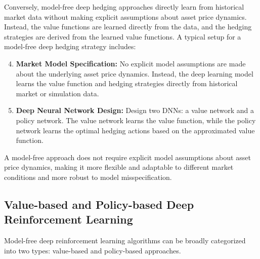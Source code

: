 Conversely, model-free deep hedging approaches directly learn from historical market data without making explicit assumptions about asset price dynamics. 
Instead, the value functions are learned directly from the data, and the hedging strategies are derived from the learned value functions.
A typical setup for a model-free deep hedging strategy includes:

\begin{enumerate}[label=\arabic*b.]
    \setcounter{enumi}{3}
    \item \textbf{Market Model Specification:} No explicit model assumptions are made about the underlying asset price dynamics. Instead, the deep learning model learns the value function and hedging strategies directly from historical market or simulation data.
    \item \textbf{Deep Neural Network Design:} Design two DNNs: a value network and a policy network. The value network learns the value function, while the policy network learns the optimal hedging actions based on the approximated value function.
\end{enumerate}

A model-free approach does not require explicit model assumptions about asset price dynamics, making it more flexible and adaptable to different market conditions and more robust to model misspecification.

\subsection{Value-based and Policy-based Deep Reinforcement Learning}

Model-free deep reinforcement learning algorithms can be broadly categorized into two types: value-based and policy-based approaches.

